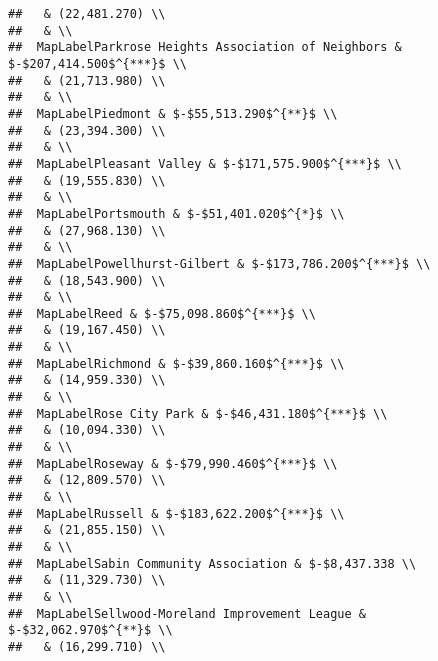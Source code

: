\documentclass[]{article}
\begin{document}
\begin{verbatim}
##   & (22,481.270) \\ 
##   & \\ 
##  MapLabelParkrose Heights Association of Neighbors & $-$207,414.500$^{***}$ \\ 
##   & (21,713.980) \\ 
##   & \\ 
##  MapLabelPiedmont & $-$55,513.290$^{**}$ \\ 
##   & (23,394.300) \\ 
##   & \\ 
##  MapLabelPleasant Valley & $-$171,575.900$^{***}$ \\ 
##   & (19,555.830) \\ 
##   & \\ 
##  MapLabelPortsmouth & $-$51,401.020$^{*}$ \\ 
##   & (27,968.130) \\ 
##   & \\ 
##  MapLabelPowellhurst-Gilbert & $-$173,786.200$^{***}$ \\ 
##   & (18,543.900) \\ 
##   & \\ 
##  MapLabelReed & $-$75,098.860$^{***}$ \\ 
##   & (19,167.450) \\ 
##   & \\ 
##  MapLabelRichmond & $-$39,860.160$^{***}$ \\ 
##   & (14,959.330) \\ 
##   & \\ 
##  MapLabelRose City Park & $-$46,431.180$^{***}$ \\ 
##   & (10,094.330) \\ 
##   & \\ 
##  MapLabelRoseway & $-$79,990.460$^{***}$ \\ 
##   & (12,809.570) \\ 
##   & \\ 
##  MapLabelRussell & $-$183,622.200$^{***}$ \\ 
##   & (21,855.150) \\ 
##   & \\ 
##  MapLabelSabin Community Association & $-$8,437.338 \\ 
##   & (11,329.730) \\ 
##   & \\ 
##  MapLabelSellwood-Moreland Improvement League & $-$32,062.970$^{**}$ \\ 
##   & (16,299.710) \\ 

\end{verbatim}
\end{document}
